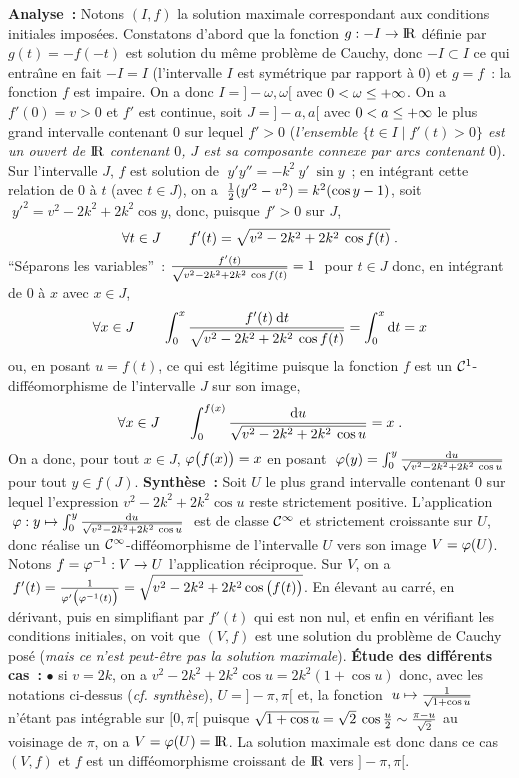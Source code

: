 \documentclass{article}
\begin{document}
{\bf Analyse~:} Notons $(I,f)$ la solution maximale correspondant aux conditions initiales impos\'ees. Constatons d'abord que la fonction $g:-I\rightarrow{\rm I\kern-0.6mm R}$ d\'efinie par $g(t)=-f(-t)$ est solution du m\^eme probl\`eme de Cauchy, donc $-I\subset I$ ce qui entra\^\i ne en fait $-I=I$ (l'intervalle $I$ est sym\'etrique par rapport \`a 0) et $g=f$~: la fonction $f$ est impaire.\ssk\sect
On a donc $I=]-\omega,\omega[$ avec $0<\omega\leq+\infty$. On a $f'(0)=v>0$ et $f'$ est continue, soit $J=]-a,a[$ avec $0<a\leq+\infty$ le plus grand intervalle contenant 0 sur lequel $f'>0$ ({\it l'ensemble $\{t\in I\;|\;f'(t)>0\}$ est un ouvert de ${\rm I\kern-0.6mm R}$ contenant $0$, $J$ est sa composante connexe par arcs contenant $0$}).\ssk\sect
Sur l'intervalle $J$, $f$ est solution de $\;y'y''=-k^2\>y'\>\sin y$~; en int\'egrant cette relation de 0 \`a $t$ (avec $t\in J$), on a $\;{1\over2}(y'^2-v^2)=k^2(\cos y-1)$, soit $\;y'^2=v^2-2k^2+2k^2\cos y$, donc, puisque $f'>0$ sur $J$,\vvv
$$\forall t\in J\qquad f'(t)=\sqrt{v^2-2k^2+2k^2\>\cos f(t)}\;.$$\sect
``S\'eparons les variables''~: ${f'(t)\over\sqrt{v^2-2k^2+2k^2\>\cos f(t)}}=1\;$ pour $t\in J$ donc, en int\'egrant de 0 \`a $x$ avec $x\in J$,\vv
$$\forall x\in J\qquad\int_0^x{f'(t)\>{\rm d}t\over\sqrt{v^2-2k^2+2k^2\>\cos f(t)}}=\int_0^x{\rm d}t=x$$
ou, en posant $u=f(t)$, ce qui est l\'egitime puisque la fonction $f$ est un ${\cal C}^1$-diff\'eomorphisme de l'intervalle $J$ sur son image,\vvv
$$\forall x\in J\qquad\int_0^{f(x)}{{\rm d}u\over\sqrt{v^2-2k^2+2k^2\>\cos u}}=x\;.$$
On a donc, pour tout $x\in J$, $\varphi\big(f(x)\big)=x$ en posant $\;\varphi(y)=\int_0^y{{\rm d}u\over\sqrt{v^2-2k^2+2k^2\>\cos u}}$ pour tout $y\in f(J)$.\msk
{\bf Synth\`ese~:} Soit $U$ le plus grand intervalle contenant 0 sur lequel l'expression $v^2-2k^2+2k^2\cos u$ reste strictement positive. L'application $\;\varphi:y\mapsto\int_0^y{{\rm d}u\over\sqrt{v^2-2k^2+2k^2\>\cos u}}\;$ est de classe ${\cal C}^{\infty}$ et strictement croissante sur $U$, donc r\'ealise un ${\cal C}^{\infty}$-diff\'eomorphisme de l'intervalle $U$ vers son image $V=\varphi(U)$. Notons $f=\varphi^{-1}:V\rightarrow U$ l'application r\'eciproque. Sur $V$, on a $\;f'(t)={1\over\varphi'\big(\varphi^{-1}(t)\big)}=\sqrt{v^2-2k^2+2k^2\cos\big(f(t)\big)}$. En \'elevant au carr\'e, en d\'erivant, puis en simplifiant par $f'(t)$ qui est non nul, et enfin en v\'erifiant les conditions initiales, on voit que $(V,f)$ est une solution du probl\`eme de Cauchy pos\'e ({\it mais ce n'est peut-\^etre pas la solution maximale}).
\bsk
{\bf \'Etude des diff\'erents cas~:}
\ssk
$\bullet$ si $v=2k$, on a $v^2-2k^2+2k^2\cos u=2k^2(1+\cos u)$ donc, avec les notations ci-dessus ({\it cf. synth\`ese}), $U=]-\pi,\pi[$ et, la fonction $\;u\mapsto{1\over\sqrt{1+\cos u}}$ n'\'etant pas int\'egrable sur $[0,\pi[$ puisque $\sqrt{1+\cos u}=\sqrt{2}\>\cos{u\over2}\sim{\pi-u\over\sqrt{2}}$ au voisinage de $\pi$, on a $V=\varphi(U)={\rm I\kern-0.6mm R}$. La solution maximale est donc dans ce cas $(V,f)$ et $f$ est un diff\'eomorphisme croissant de ${\rm I\kern-0.6mm R}$ vers $]-\pi,\pi[$.\ssk\new
\end{document}
